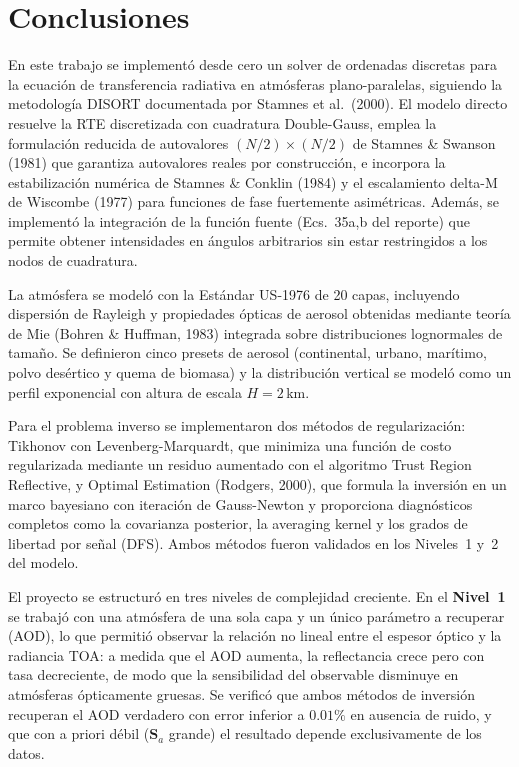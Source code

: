 \documentclass[a4paper,11pt]{article}
\begin{document}
\section{Conclusiones}

En este trabajo se implement\'o desde cero un solver de ordenadas discretas
para la ecuaci\'on de transferencia radiativa en atm\'osferas plano-paralelas,
siguiendo la metodolog\'ia DISORT documentada por Stamnes et al.\ (2000).
El modelo directo resuelve la RTE discretizada con cuadratura Double-Gauss,
emplea la formulaci\'on reducida de autovalores $(N/2)\times(N/2)$ de
Stamnes \& Swanson (1981) que garantiza autovalores reales por construcci\'on,
e incorpora la estabilizaci\'on num\'erica de Stamnes \& Conklin (1984) y el
escalamiento delta-M de Wiscombe (1977) para funciones de fase fuertemente
asim\'etricas. Adem\'as, se implement\'o la integraci\'on de la funci\'on fuente
(Ecs.~35a,b del reporte) que permite obtener intensidades en \'angulos
arbitrarios sin estar restringidos a los nodos de cuadratura.

La atm\'osfera se model\'o con la Est\'andar US-1976 de 20 capas, incluyendo
dispersi\'on de Rayleigh y propiedades \'opticas de aerosol obtenidas
mediante teor\'ia de Mie (Bohren \& Huffman, 1983) integrada sobre
distribuciones lognormales de tama\~no. Se definieron cinco presets de
aerosol (continental, urbano, mar\'itimo, polvo des\'ertico y quema de biomasa)
y la distribuci\'on vertical se model\'o como un perfil exponencial con
altura de escala $H = 2$\,km.

Para el problema inverso se implementaron dos m\'etodos de regularizaci\'on:
Tikhonov con Levenberg-Marquardt, que minimiza una funci\'on de costo
regularizada mediante un residuo aumentado con el algoritmo Trust Region
Reflective, y Optimal Estimation (Rodgers, 2000), que formula la inversi\'on
en un marco bayesiano con iteraci\'on de Gauss-Newton y proporciona
diagn\'osticos completos como la covarianza posterior, la averaging kernel
y los grados de libertad por se\~nal (DFS). Ambos m\'etodos fueron validados
en los Niveles~1 y~2 del modelo.

El proyecto se estructur\'o en tres niveles de complejidad creciente.
En el \textbf{Nivel~1} se trabaj\'o con una atm\'osfera de una sola capa
y un \'unico par\'ametro a recuperar (AOD), lo que permiti\'o observar
la relaci\'on no lineal entre el espesor \'optico y la radiancia TOA:
a medida que el AOD aumenta, la reflectancia crece pero con tasa
decreciente, de modo que la sensibilidad del observable disminuye
en atm\'osferas \'opticamente gruesas. Se verific\'o que ambos m\'etodos
de inversi\'on recuperan el AOD verdadero con error inferior a $0.01\%$
en ausencia de ruido, y que con a priori d\'ebil ($\mathbf{S}_a$ grande)
el resultado depende exclusivamente de los datos.
\end{document}
